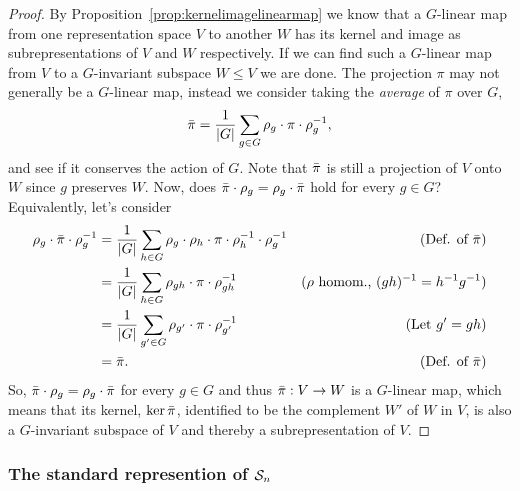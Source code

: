 \begin{proof}
	By Proposition~\ref{prop:kernelimagelinearmap} we know that a $G$-linear map from one representation space $V$ to another $W$ has its kernel and image as subrepresentations of $V$ and $W$ respectively. If we can find such a $G$-linear map from $V$ to a $G$-invariant subspace $W \leq V$ we are done.
	The projection $\pi$ may not generally be a $G$-linear map, instead we consider taking the \textit{average} of $\pi$ over $G$,
	\begin{align*}
		\bar{\pi} = \frac{1}{|G|} \sum_{g \in G} \rho_g \cdot \pi \cdot \rho_g^{-1},
	\end{align*}
	and see if it conserves the action of $G$. Note that $\bar{\pi}$ is still a projection of $V$ onto $W$ since $g$ preserves $W$. Now, does $\bar{\pi}\cdot \rho_g = \rho_g \cdot \bar{\pi}$ hold for every $g \in G$? Equivalently, let's consider
	\begin{align*}
		\rho_g \cdot \bar{\pi} \cdot \rho_g^{-1} &= \frac{1}{|G|} \sum_{h \in G} \rho_g \cdot \rho_h \cdot \pi \cdot \rho_h^{-1} \cdot \rho_g^{-1} & \text{(Def. of $\bar{\pi}$)}\\
		&= \frac{1}{|G|} \sum_{h \in G} \rho_{gh} \cdot \pi \cdot \rho_{gh}^{-1} & \text{($\rho$ homom., $(gh)^{-1}=h^{-1}g^{-1}$)}\\
		&= \frac{1}{|G|} \sum_{g' \in G} \rho_{g'} \cdot \pi \cdot \rho_{g'}^{-1} & \text{(Let $g' = gh$)} \\
		&= \bar{\pi}. & \text{(Def. of $\bar{\pi}$)}
	\end{align*}
	So, $\bar{\pi} \cdot \rho_g = \rho_g \cdot \bar{\pi}$ for every $g \in G$ and thus $\bar{\pi}: V \rightarrow W$ is a $G$-linear map, which means that its kernel, $\ker \bar{\pi}$, identified to be the complement $W'$ of $W$ in $V$, is also a $G$-invariant subspace of $V$ and thereby a subrepresentation of $V$.
\end{proof}

\subsubsection{The standard represention of $\mathcal{S}_n$}

